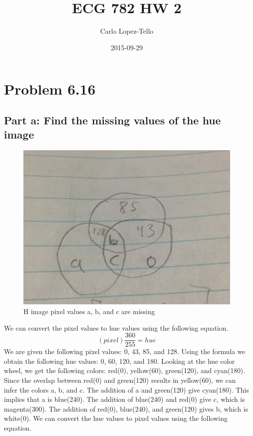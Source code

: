 \documentclass{article}
\title{ECG 782 HW 2}
\date{2015-09-29}
\author{Carlo Lopez-Tello}
\begin{document}
\maketitle
	\newpage
	\section{Problem 6.16}
	
	\subsection{Part a: Find the missing values of the hue image}
	\begin{figure}[H]
		\includegraphics[width=\linewidth]{6.16/fig1.JPG}
		\caption{H image pixel values a, b, and c are missing}
	\end{figure}
	
	We can convert the pixel values to hue values using the following equation.
	\[(pixel)\frac{360}{255} = hue\]
	We are given the following pixel values: 0, 43, 85, and 128.
	Using the formula we obtain the following hue values: 0, 60, 120, and 180.
	Looking at the hue color wheel, we get the following colors: red(0), yellow(60), green(120), and cyan(180).
	Since the overlap between red(0) and green(120) results in yellow(60), we can infer the colors a, b, and c. The addition of a and green(120) give cyan(180). This implies that a is blue(240). The addition of blue(240) and red(0) give c, which is magenta(300). The addition of red(0), blue(240), and green(120) gives b, which is white(0).
	We can convert the hue values to pixel values using the following equation.
	
\end{document}
